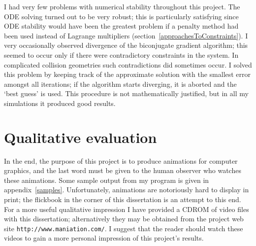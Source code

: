 I had very few problems with numerical stability throughout this project. The ODE solving turned
out to be very robust; this is particularly satisfying since ODE stability would have been the
greatest problem if a penalty method had been used instead of Lagrange multipliers
(section~\ref{approachesToConstraints}). I very occasionally observed divergence of the biconjugate
gradient algorithm; this seemed to occur only if there were contradictory constraints in the
system. In complicated collision geometries such contradictions did sometimes occur. I solved this
problem by keeping track of the approximate solution with the smallest error amongst all
iterations; if the algorithm starts diverging, it is aborted and the `best guess' is used.
This procedure is not mathematically justified, but in all my simulations it produced good results.


\section{Qualitative evaluation}

In the end, the purpose of this project is to produce animations for computer graphics, and the
last word must be given to the human observer who watches these animations. Some sample output
from my program is given in appendix~\ref{samples}. Unfortunately, animations are notoriously hard
to display in print; the flickbook in the corner of this dissertation is an attempt to this end.
For a more useful qualitative impression I have provided a CDROM of video files with this
dissertation; alternatively they may be obtained from the project web site
\texttt{http://www.maniation.com/}. I suggest that the reader should watch these videos to gain
a more personal impression of this project's results.
